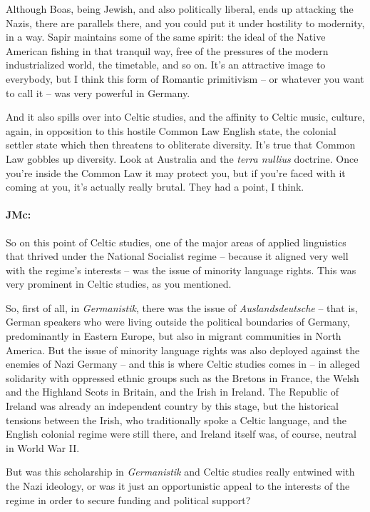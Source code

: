 \documentclass[output=paper]{langscibook}
\begin{document}
Although Boas, being Jewish, and also politically liberal, ends up attacking the Nazis, there are parallels there, and you could put it under hostility to modernity, in a way. Sapir maintains some of the same spirit: the ideal of the Native American fishing in that tranquil way, free of the pressures of the modern industrialized world, the timetable, and so on. It’s an attractive image to everybody, but I think this form of Romantic primitivism – or whatever you want to call it – was very powerful in Germany. 

And it also spills over into Celtic studies, and the affinity to Celtic music, culture, again, in opposition to this hostile Common Law English state, the colonial settler state which then threatens to obliterate diversity. It’s true that Common Law gobbles up diversity. Look at Australia and the \textit{terra nullius} doctrine. Once you’re inside the Common Law it may protect you, but if you’re faced with it coming at you, it’s actually really brutal. They had a point, I think.

\paragraph*{JMc:} So on this point of Celtic studies, one of the major areas of applied linguistics that thrived under the National Socialist regime – because it aligned very well with the regime’s interests – was the issue of minority language rights. This was very prominent in Celtic studies, as you mentioned.

So, first of all, in \textit{Germanistik}, there was the issue of \textit{Auslandsdeutsche} – that is, German speakers who were living outside the political boundaries of Germany, predominantly in Eastern Europe, but also in migrant communities in North America. But the issue of minority language rights was also deployed against the enemies of Nazi Germany – and this is where Celtic studies comes in – in alleged solidarity with oppressed ethnic groups such as the Bretons in France, the Welsh and the Highland Scots in Britain, and the Irish in Ireland. The Republic of Ireland was already an independent country by this stage, but the historical tensions between the Irish, who traditionally spoke a Celtic language, and the English colonial regime were still there, and Ireland itself was, of course, neutral in World War II. 

But was this scholarship in \textit{Germanistik} and Celtic studies really entwined with the Nazi ideology, or was it just an opportunistic appeal to the interests of the regime in order to secure funding and political support?
\end{document}
